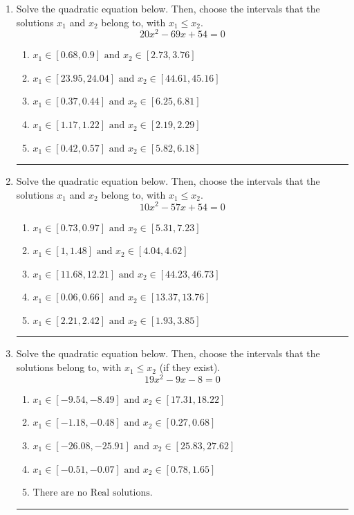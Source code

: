 \documentclass[14pt]{extbook}
\newcommand{\litem}[1]{\item#1\hspace*{-1cm}\rule{\textwidth}{0.4pt}}
\begin{document}
\begin{enumerate}
{\begin{enumerate}[label=\Alph*.]
\end{enumerate} }
\litem{
Solve the quadratic equation below. Then, choose the intervals that the solutions $x_1$ and $x_2$ belong to, with $x_1 \leq x_2$.\[ 20x^{2} -69 x + 54 = 0 \]\begin{enumerate}[label=\Alph*.]
\item \( x_1 \in [0.68, 0.9] \text{ and } x_2 \in [2.73, 3.76] \)
\item \( x_1 \in [23.95, 24.04] \text{ and } x_2 \in [44.61, 45.16] \)
\item \( x_1 \in [0.37, 0.44] \text{ and } x_2 \in [6.25, 6.81] \)
\item \( x_1 \in [1.17, 1.22] \text{ and } x_2 \in [2.19, 2.29] \)
\item \( x_1 \in [0.42, 0.57] \text{ and } x_2 \in [5.82, 6.18] \)

\end{enumerate} }
\litem{
Solve the quadratic equation below. Then, choose the intervals that the solutions $x_1$ and $x_2$ belong to, with $x_1 \leq x_2$.\[ 10x^{2} -57 x + 54 = 0 \]\begin{enumerate}[label=\Alph*.]
\item \( x_1 \in [0.73, 0.97] \text{ and } x_2 \in [5.31, 7.23] \)
\item \( x_1 \in [1, 1.48] \text{ and } x_2 \in [4.04, 4.62] \)
\item \( x_1 \in [11.68, 12.21] \text{ and } x_2 \in [44.23, 46.73] \)
\item \( x_1 \in [0.06, 0.66] \text{ and } x_2 \in [13.37, 13.76] \)
\item \( x_1 \in [2.21, 2.42] \text{ and } x_2 \in [1.93, 3.85] \)

\end{enumerate} }
\litem{
Solve the quadratic equation below. Then, choose the intervals that the solutions belong to, with $x_1 \leq x_2$ (if they exist).\[ 19x^{2} -9 x -8 = 0 \]\begin{enumerate}[label=\Alph*.]
\item \( x_1 \in [-9.54, -8.49] \text{ and } x_2 \in [17.31, 18.22] \)
\item \( x_1 \in [-1.18, -0.48] \text{ and } x_2 \in [0.27, 0.68] \)
\item \( x_1 \in [-26.08, -25.91] \text{ and } x_2 \in [25.83, 27.62] \)
\item \( x_1 \in [-0.51, -0.07] \text{ and } x_2 \in [0.78, 1.65] \)
\item \( \text{There are no Real solutions.} \)

\end{enumerate} }
\end{enumerate}
\end{document}

